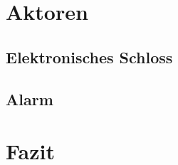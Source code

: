 \documentclass{sigchi}
\begin{document}
\section{Aktoren}

\subsection{Elektronisches Schloss}

\subsection{Alarm}

\section{Fazit}

\balance{}



\end{document}
